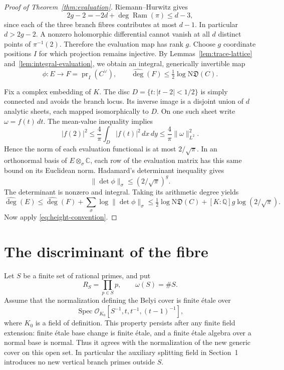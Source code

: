 \documentclass[11pt,a4paper]{article}
\theoremstyle{definition}
\newcommand{\Q}{\mathbb Q}
\newcommand{\C}{\mathbb C}
\newcommand{\Ardeg}{\widehat{\deg}}
\begin{document}
\begin{proof}[Proof of Theorem~\ref{thm:evaluation}]
Riemann--Hurwitz gives
\[
 2g-2=-2d+\deg\operatorname{Ram}(\pi)\le d-3,
\]
since each of the three branch fibres contributes at most $d-1$.
In particular $d>2g-2$. A nonzero holomorphic differential cannot
vanish at all $d$ distinct points of $\pi^{-1}(2)$. Therefore the
evaluation map has rank $g$. Choose $g$ coordinate positions $I$
for which projection remains injective. By
Lemmas~\ref{lem:trace-lattice} and~\ref{lem:integral-evaluation},
we obtain an integral, generically invertible map
\[
 \phi:E\longrightarrow F=\operatorname{pr}_I(C^\vee),
 \qquad\Ardeg(F)\le\tfrac12\log\mathrm N\mathfrak D(C).
\]

Fix a complex embedding of $K$. The disc
$D=\{t:|t-2|<1/2\}$ is simply connected and avoids the branch
locus. Its inverse image is a disjoint union of $d$ analytic
sheets, each mapped isomorphically to $D$. On one such sheet write
$\omega=f(t)\,dt$. The mean-value inequality implies
\[
 |f(2)|^2\le\frac4\pi\int_D|f(t)|^2\,dx\,dy
       \le\frac4\pi\|\omega\|_{L^2}^2.
\]
Hence the norm of each evaluation functional is at most
$2/\sqrt\pi$. In an orthonormal basis of $E\otimes_\sigma\C$,
each row of the evaluation matrix has this same bound on its
Euclidean norm. Hadamard's determinant inequality gives
\[
 \|\det\phi\|_\sigma\le(2/\sqrt\pi)^g.
\]
The determinant is nonzero and integral. Taking its arithmetic
degree yields
\[
 \Ardeg(E)\le\Ardeg(F)
       +\sum_\sigma\log\|\det\phi\|_\sigma
 \le\tfrac12\log\mathrm N\mathfrak D(C)
       +[K:\Q]g\log(2/\sqrt\pi).
\]
Now apply \eqref{eq:height-convention}.
\end{proof}

\section{The discriminant of the fibre}

Let $S$ be a finite set of rational primes, and put
\[
 R_S=\prod_{p\in S}p,\qquad \omega(S)=\#S.
\]
Assume that the normalization defining the Belyi cover is finite
\'etale over
\begin{equation}\label{eq:good-open}
 \operatorname{Spec}\mathcal O_{K_0}
       [S^{-1},t,t^{-1},(t-1)^{-1}],
\end{equation}
where $K_0$ is a field of definition.
This property persists after any finite field extension:
finite \'etale base change is finite \'etale, and a finite \'etale
algebra over a normal base is normal. Thus it agrees with the
normalization of the new generic cover on this open set.
In particular the auxiliary splitting field in Section~1 introduces
no new vertical branch primes outside $S$.
\end{document}

